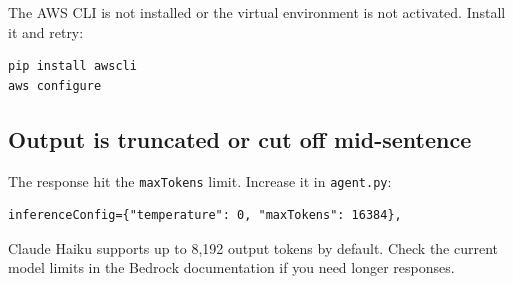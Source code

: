 \documentclass[12pt, a4paper]{article}
\begin{document}
The AWS CLI is not installed or the virtual environment is not activated. Install it and retry:

\begin{lstlisting}[style=shellstyle]
pip install awscli
aws configure
\end{lstlisting}

\subsection{Output is truncated or cut off mid-sentence}

The response hit the \texttt{maxTokens} limit. Increase it in \texttt{agent.py}:

\begin{lstlisting}[style=pythonstyle]
inferenceConfig={"temperature": 0, "maxTokens": 16384},
\end{lstlisting}

Claude Haiku supports up to 8{,}192 output tokens by default. Check the current model limits in the Bedrock documentation if you need longer responses.
\end{document}
